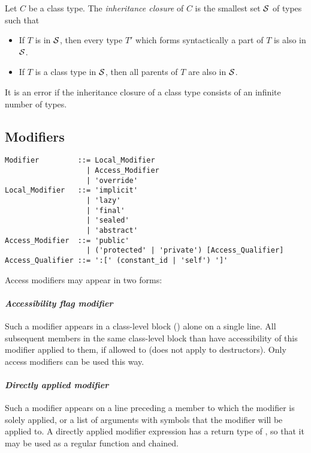 \newcommand{\inheritclosure}{{\cal S}}

Let $C$ be a class type. The {\em inheritance closure} of $C$ is the smallest set $\inheritclosure$ of types such that
\begin{itemize}
\item If $T$ is in $\inheritclosure$, then every type $T'$ which forms syntactically a part of $T$ is also in $\inheritclosure$. 
\item If $T$ is a class type in $\inheritclosure$, then all parents of $T$ are also in $\inheritclosure$. 
\end{itemize}
It is an error if the inheritance closure of a class type consists of an infinite number of types. 

\subsection{Modifiers}
\label{sec:modifiers}

\syntax\begin{lstlisting}
Modifier         ::= Local_Modifier
                   | Access_Modifier
                   | 'override'
Local_Modifier   ::= 'implicit'
                   | 'lazy'
                   | 'final'
                   | 'sealed'
                   | 'abstract'
Access_Modifier  ::= 'public'
                   | ('protected' | 'private') [Access_Qualifier]
Access_Qualifier ::= ':[' (constant_id | 'self') ']'
\end{lstlisting}

Access modifiers may appear in two forms:

\paragraph{\em Accessibility flag modifier}
Such a modifier appears in a class-level block () alone on a single line. All subsequent members in the same class-level block than have accessibility of this modifier applied to them, if allowed to (does not apply to destructors). Only access modifiers can be used this way. 

\paragraph{\em Directly applied modifier}
Such a modifier appears on a line preceding a member to which the modifier is solely applied, or a list of arguments with symbols that the modifier will be applied to. A directly applied modifier expression has a return type of , so that it may be used as a regular function and chained. 

